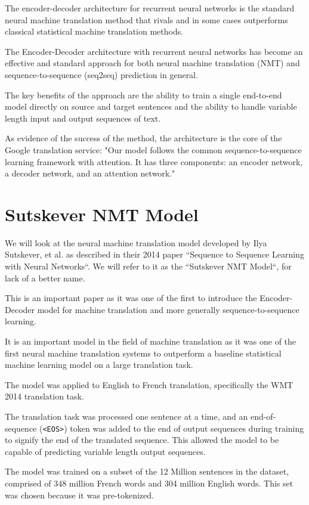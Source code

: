 \documentclass[10pt,a4paper]{article}
\begin{document}
The encoder-decoder architecture for recurrent neural networks is the standard neural machine translation method that rivals and in some cases outperforms classical statistical machine translation methods.

The Encoder-Decoder architecture with recurrent neural networks has become an effective and standard approach for both neural machine translation (NMT) and sequence-to-sequence (seq2seq) prediction in general.

The key benefits of the approach are the ability to train a single end-to-end model directly on source and target sentences and the ability to handle variable length input and output sequences of text.

As evidence of the success of the method, the architecture is the core of the Google translation service:
"Our model follows the common sequence-to-sequence learning framework with attention. It has three components: an encoder network, a decoder network, and an attention network."

\section{Sutskever NMT Model}
We will look at the neural machine translation model developed by Ilya Sutskever, et al. as described in their 2014 paper “Sequence to Sequence Learning with Neural Networks“. We will refer to it as the “Sutskever NMT Model“, for lack of a better name.

This is an important paper as it was one of the first to introduce the Encoder-Decoder model for machine translation and more generally sequence-to-sequence learning.

It is an important model in the field of machine translation as it was one of the first neural machine translation systems to outperform a baseline statistical machine learning model on a large translation task.

The model was applied to English to French translation, specifically the WMT 2014 translation task.

The translation task was processed one sentence at a time, and an end-of-sequence (\verb-<EOS>-) token was added to the end of output sequences during training to signify the end of the translated sequence. This allowed the model to be capable of predicting variable length output sequences.

The model was trained on a subset of the 12 Million sentences in the dataset, comprised of 348 million French words and 304 million English words. This set was chosen because it was pre-tokenized.
\end{document}

